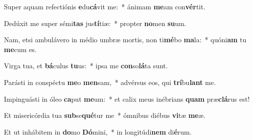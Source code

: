 \item Super aquam refectiónis \textbf{e}du\textbf{cá}vit me:~* ánimam \textbf{me}am con\textbf{vér}tit.
\item Dedúxit me super sémi\textbf{tas} jus\textbf{tí}tiæ:~* propter \textbf{no}men \textbf{su}um.
\item Nam, etsi ambulávero in médio umbræ mortis, non ti\textbf{mé}bo \textbf{ma}la:~* quóni\textbf{am} tu \textbf{me}cum es.
\item Virga tua, et \textbf{bá}culus \textbf{tu}us:~* ipsa me \textbf{con}so\textbf{lá}ta sunt.
\item Parásti in conspéctu \textbf{me}o \textbf{men}sam,~* advérsus eos, qui \textbf{trí}bu\textbf{lant} me.
\item Impinguásti in óleo \textbf{ca}put \textbf{me}um:~* et calix meus inébrians \textbf{quam} præ\textbf{clá}rus est!
\item Et misericórdia tua \textbf{sub}se\textbf{qué}tur me~* ómnibus diébus \textbf{vi}tæ \textbf{me}æ.
\item Et ut inhábitem in \textbf{do}mo \textbf{Dó}mini,~* in longitúdi\textbf{nem} di\textbf{é}rum.
